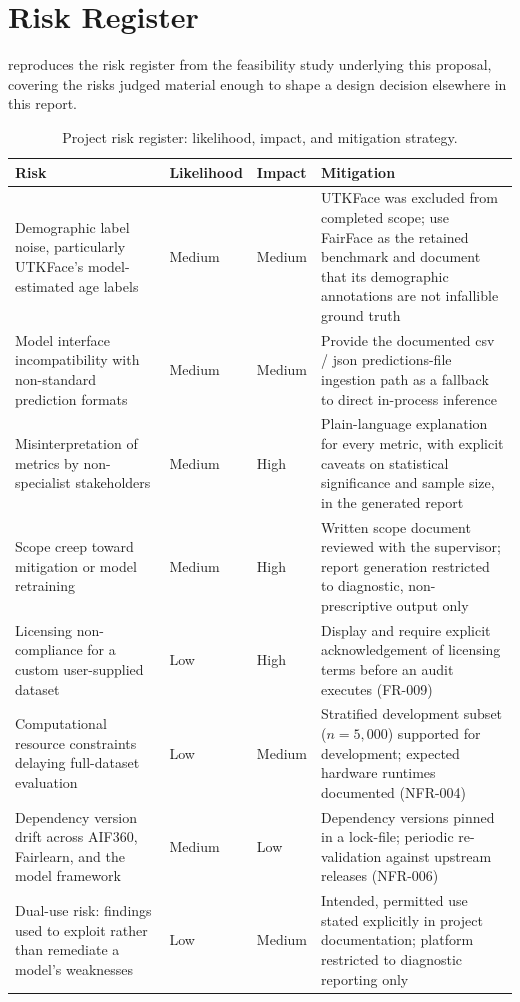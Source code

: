 \chapter{Risk Register}%
\label{app:riskregister}

 reproduces the risk register from the feasibility study underlying this proposal, covering the risks judged material enough to shape a design decision elsewhere in this report.

\begin{table}[htbp]
    \centering
    \renewcommand{\arraystretch}{1.3}
    \caption{Project risk register: likelihood, impact, and mitigation strategy.}%
    \label{tab:riskregister}
    \begin{tabular}{p{3cm}p{1.9cm}p{1.6cm}p{6.5cm}}
        \toprule
        \textbf{Risk} & \textbf{Likelihood} & \textbf{Impact} & \textbf{Mitigation} \\
        \midrule
        Demographic label noise, particularly UTKFace's model-estimated age labels & Medium & Medium & UTKFace was excluded from completed scope; use FairFace as the retained benchmark and document that its demographic annotations are not infallible ground truth \\
        Model interface incompatibility with non-standard prediction formats & Medium & Medium & Provide the documented \gls{csv} / \gls{json} predictions-file ingestion path as a fallback to direct in-process inference \\
        Misinterpretation of metrics by non-specialist stakeholders & Medium & High & Plain-language explanation for every metric, with explicit caveats on statistical significance and sample size, in the generated report \\
        Scope creep toward mitigation or model retraining & Medium & High & Written scope document reviewed with the supervisor; report generation restricted to diagnostic, non-prescriptive output only \\
        Licensing non-compliance for a custom user-supplied dataset & Low & High & Display and require explicit acknowledgement of licensing terms before an audit executes (FR-009) \\
        Computational resource constraints delaying full-dataset evaluation & Low & Medium & Stratified development subset ($n=5{,}000$) supported for development; expected hardware runtimes documented (NFR-004) \\
        Dependency version drift across AIF360, Fairlearn, and the model framework & Medium & Low & Dependency versions pinned in a lock-file; periodic re-validation against upstream releases (NFR-006) \\
        Dual-use risk: findings used to exploit rather than remediate a model's weaknesses & Low & Medium & Intended, permitted use stated explicitly in project documentation; platform restricted to diagnostic reporting only \\
        \bottomrule
    \end{tabular}
\end{table}
